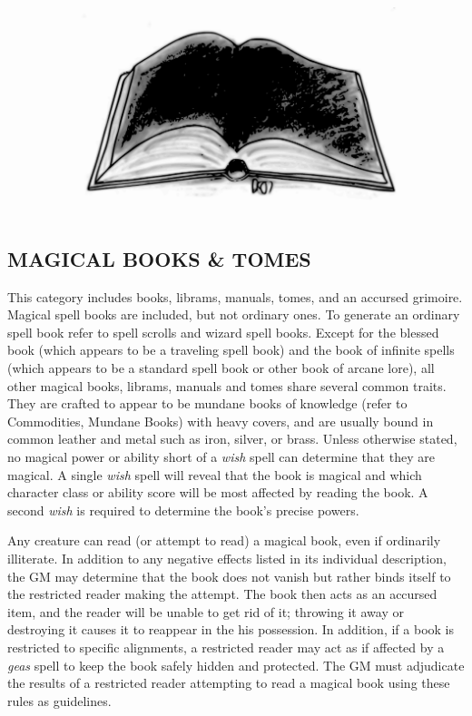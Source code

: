 \begin{multicols}{2}
\noindent\includegraphics[width=\columnwidth]{vacuous.pdf}\label{vacuous}

\subsection{MAGICAL BOOKS \& TOMES}

This category includes books, librams, manuals, tomes, and an accursed grimoire.  Magical spell books are included, but not ordinary ones.  To generate an ordinary spell book refer to spell scrolls and wizard spell books.  Except for the blessed book (which appears to be a traveling spell book) and the book of infinite spells (which appears to be a standard spell book or other book of arcane lore), all other magical books, librams, manuals and tomes share several common traits.  They are crafted to appear to be mundane books of knowledge (refer to Commodities, Mundane Books) with heavy covers, and are usually bound in common leather and metal such as iron, silver, or brass.  Unless otherwise stated, no magical power or ability short of a \textit{wish} spell can determine that they are magical.  A single \textit{wish} spell will reveal that the book is magical and which character class or ability score will be most affected by reading the book.  A second \textit{wish} is required to determine the book's precise powers.

Any creature can read (or attempt to read) a magical book, even if ordinarily illiterate.  In addition to any negative effects listed in its individual description, the GM may determine that the book does not vanish but rather binds itself to the restricted reader making the attempt.  The book then acts as an accursed item, and the reader will be unable to get rid of it; throwing it away or destroying it causes it to reappear in the his possession.  In addition, if a book is restricted to specific alignments, a restricted reader may act as if affected by a \textit{geas} spell to keep the book safely hidden and protected. The GM must adjudicate the results of a restricted reader attempting to read a magical book using these rules as guidelines.


\end{multicols}
